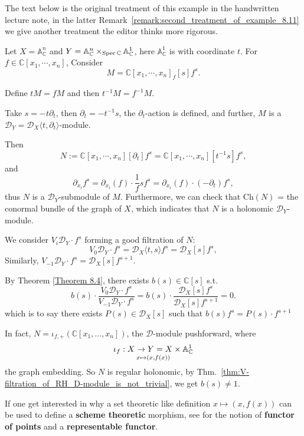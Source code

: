 \begin{example}\label{Example 8.11}
    The text below is the original treatment of this example in the handwritten lecture note,
    in the latter Remark~\ref{remark:second_treatment_of_example_8.11} we give another treatment the editor thinks more rigorous.

    \medskip

    Let $X = \mathbb{A}_{\mathbb{C}}^n$ and $Y = \mathbb{A}_{\mathbb{C}}^n \times_{\operatorname{Spec}{\mathbb{C}}} \mathbb{A}_{\mathbb{C}}^1$, here $\mathbb{A}^{1}_{\mathbb{C}}$ is with coordinate $t$.
    For $f \in \mathbb{C}[x_1, \cdots, x_n]$, Consider
    \[
        M = \mathbb{C}[x_1, \cdots, x_n]_f[s] f^s.
    \]

    Define $t M = f M$ and then $t^{-1} M = f^{-1} M$.

    Take $s = -t\partial_t$, then $\partial_t = -t^{-1} s$, the $\partial_{t}$-action is defined,
    and further, $M$ is a $\mathcal{D}_Y = \mathcal{D}_X \langle t, \partial_t \rangle$-module.

    Then
    \[
        N := \mathbb{C}[x_1, \cdots, x_n][\partial_t] f^s= \mathbb{C}[x_1, \cdots, x_n][t^{-1} s] f^s,
    \]
    and
    \[
        \partial_{x_i} f^s = \partial_{x_i}(f) \cdot \frac{1}{f} s f^s= \partial_{x_i}(f) \cdot (-\partial_t) f^s,
    \]
    thus $N$ is a $\mathcal{D}_Y$-submodule of $M$.
    Furthermore, we can check that $\mathrm{Ch}(N)$ = the conormal bundle of the graph of $X$,
    which indicates that $N$ is a holonomic $\mathcal{D}_{Y}$-module.

    We consider $V_{i}\mathcal{D}_{Y}\cdot f^{s}$ forming a good filtration of $N$:
    \[
        V_0 \mathcal{D}_Y \cdot f^s = \mathcal{D}_X \langle t, s \rangle f^s = \mathcal{D}_X[s] f^s,
    \]
    Similarly, $V_{-1} \mathcal{D}_Y \cdot f^s = \mathcal{D}_X[s] f^{s+1}$.

    By Theorem \ref{Theorem 8.4}, there exists $b(s) \in \mathbb{C}[s]$ s.t.
    \[
        b(s) \cdot \frac{V_0 \mathcal{D}_Y \cdot f^s}{V_{-1} \mathcal{D}_Y \cdot f^s} = b(s) \cdot \frac{\mathcal{D}_X[s] f^s}{\mathcal{D}_X[s] f^{s+1}} = 0.
    \]
    which is to say there exists $P(s)\in \mathcal{D}_{X}[s]$ such that $b(s) f^s = P(s) \cdot f^{s+1}$

    In fact, $N = \iota_{f,+} (\mathbb{C}[x_1, \ldots, x_n])$, the $\mathcal{D}$-module pushforward, where
    \[
        \iota_f: X \to Y = X \times \mathbb{A}^{1}_{\mathbb{C}}\atop x \mapsto (x, f(x))
    \]
    the graph embedding. So $N$ is regular holonomic, by Thm.~\ref{thm:V-filtration_of_RH_D-module_is_not_trivial}, we get $b(s) \neq 1$.

    If one get interested in why a set theoretic like definition $x \mapsto (x, f(x))$ can be used to define a \textbf{scheme theoretic} morphism,
    see \cite[\href{https://stacks.math.columbia.edu/tag/001O}{Tag 001O}]{stacks-project} for the notion of \textbf{functor of points} and a \textbf{representable functor}.
\end{example}

